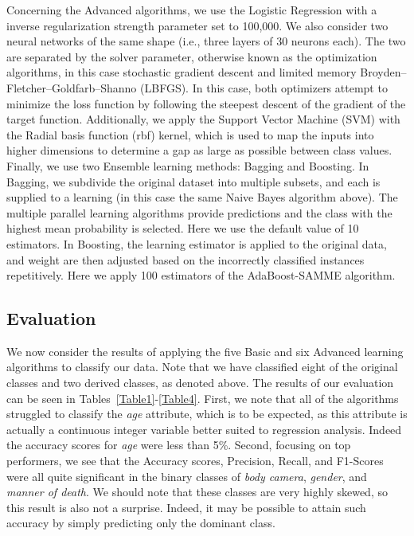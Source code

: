 \documentclass[10pt, conference, compsocconf]{IEEEtran}
\begin{document}
Concerning the Advanced algorithms, we use the Logistic Regression with a inverse regularization strength parameter set to 100,000. We also consider two neural networks of the same shape (i.e., three layers of 30 neurons each). The two are separated by the solver parameter, otherwise known as the optimization algorithms, in this case stochastic gradient descent and limited memory Broyden–Fletcher–Goldfarb–Shanno (LBFGS). In this case, both optimizers attempt to minimize the loss function by following the steepest descent of the gradient of the target function. Additionally, we apply the Support Vector Machine (SVM) with the Radial basis function (rbf) kernel, which is used to map the inputs into higher dimensions to determine a gap as large as possible between class values. Finally, we use two Ensemble learning methods: Bagging and Boosting. In Bagging, we subdivide the original dataset into multiple subsets, and each is supplied to a learning (in this case the same Naive Bayes algorithm above). The multiple parallel learning algorithms provide predictions and the class with the highest mean probability is selected. Here we use the default value of 10 estimators. In Boosting, the learning estimator is applied to the original data, and weight are then adjusted based on the incorrectly classified instances repetitively. Here we apply 100 estimators of the AdaBoost-SAMME algorithm.  

\subsection{Evaluation}

We now consider the results of applying the five Basic and six Advanced learning algorithms to classify our data. Note that we have classified eight of the original classes and two derived classes, as denoted above. The results of our evaluation can be seen in Tables~\ref{Table1}-\ref{Table4}. First, we note that all of the algorithms struggled to classify the \textit{age} attribute, which is to be expected, as this attribute is actually a continuous integer variable better suited to regression analysis. Indeed the accuracy scores for \textit{age} were less than 5\%. Second, focusing on top performers, we see that the Accuracy scores, Precision, Recall, and F1-Scores were all quite significant in the binary classes of \textit{body camera}, \textit{gender}, and \textit{manner of death}. We should note that these classes are very highly skewed, so this result is also not a surprise. Indeed, it may be possible to attain such accuracy by simply predicting only the dominant class. 
\end{document}
